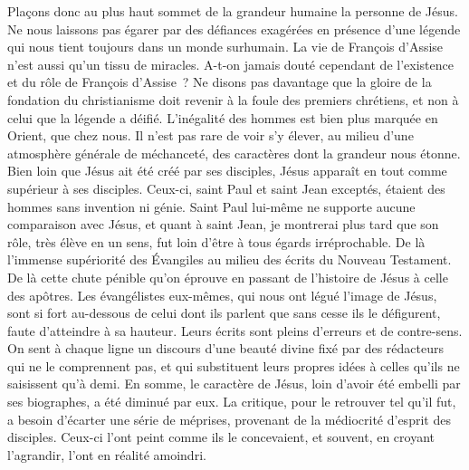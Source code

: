 \documentclass[french,twoside]{book} %
\begin{document}
Plaçons donc au plus haut sommet de la grandeur humaine la personne de Jésus. Ne nous laissons pas égarer par des défiances exagérées en présence d’une légende qui nous tient toujours dans un monde surhumain. La vie de François d’Assise n’est aussi qu’un tissu de miracles. A-t-on jamais douté cependant de l’existence et du rôle de François d’Assise ? Ne disons pas davantage que la gloire de la fondation du christianisme doit revenir à la foule des premiers chrétiens, et non à celui que la légende a déifié. L’inégalité des hommes est bien plus marquée en Orient, que chez nous. Il n’est pas rare de voir s’y élever, au milieu d’une atmosphère générale de méchanceté, des caractères dont la grandeur nous étonne. Bien loin que Jésus ait été créé par ses disciples, Jésus apparaît en tout comme supérieur à ses disciples. Ceux-ci, saint Paul et saint Jean exceptés, étaient des hommes sans invention ni génie. Saint Paul lui-même ne supporte aucune comparaison avec Jésus, et quant à saint Jean, je montrerai plus tard que son rôle, très élève en un sens, fut loin d’être à tous égards irréprochable. De là l’immense supériorité des Évangiles au milieu des écrits du Nouveau Testament. De là cette chute pénible qu’on éprouve en passant de l’histoire de Jésus à celle des apôtres. Les évangélistes eux-mêmes, qui nous ont légué l’image de Jésus, sont si fort au-dessous de celui dont ils parlent que sans cesse ils le défigurent, faute d’atteindre à sa hauteur. Leurs écrits sont pleins d’erreurs et de contre-sens. On sent à chaque ligne un discours d’une beauté divine fixé par des rédacteurs qui ne le comprennent pas, et qui substituent leurs propres idées à celles qu’ils ne saisissent qu’à demi. En somme, le caractère de Jésus, loin d’avoir été embelli par ses biographes, a été diminué par eux. La critique, pour le retrouver tel qu’il fut, a besoin d’écarter une série de méprises, provenant de la médiocrité d’esprit des disciples. Ceux-ci l’ont peint comme ils le concevaient, et souvent, en croyant l’agrandir, l’ont en réalité amoindri.\par
\end{document}
